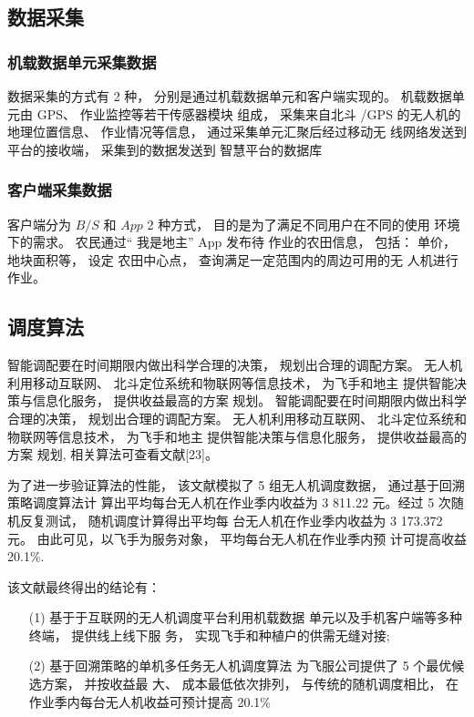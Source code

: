 \documentclass[UTF8,a4paper,10pt,nocolorlinks]{ctexart}
\begin{document}
\subsection{数据采集}
\subsubsection{机载数据单元采集数据}
数据采集的方式有
2 种， 分别是通过机载数据单元和客户端实现的。
机载数据单元由 GPS、 作业监控等若干传感器模块
组成， 采集来自北斗 /GPS 的无人机的地理位置信息、
作业情况等信息， 通过采集单元汇聚后经过移动无
线网络发送到平台的接收端， 采集到的数据发送到
智慧平台的数据库
\subsubsection{客户端采集数据}
客户端分为 $B/S$ 和 $App$ 2 种方式， 目的是为了满足不同用户在不同的使用
环境下的需求。 农民通过“ 我是地主” App 发布待
作业的农田信息， 包括： 单价， 地块面积等， 设定
农田中心点， 查询满足一定范围内的周边可用的无
人机进行作业。 
\subsection{调度算法}
智能调配要在时间期限内做出科学合理的决策，
规划出合理的调配方案。 无人机利用移动互联网、
北斗定位系统和物联网等信息技术， 为飞手和地主
提供智能决策与信息化服务， 提供收益最高的方案
规划。
智能调配要在时间期限内做出科学合理的决策，
规划出合理的调配方案。 无人机利用移动互联网、
北斗定位系统和物联网等信息技术， 为飞手和地主
提供智能决策与信息化服务， 提供收益最高的方案
规划, 相关算法可查看文献[23]。\par
为了进一步验证算法的性能， 该文献模拟了 5 组无人机调度数据， 通过基于回溯策略调度算法计
算出平均每台无人机在作业季内收益为 3 811.22 元。经过 5 次随机反复测试， 随机调度计算得出平均每
台无人机在作业季内收益为 3 173.372 元。 由此可见，以飞手为服务对象， 平均每台无人机在作业季内预
计可提高收益 20.1\%.\par
该文献最终得出的结论有：
\begin{itemize}
  \item [(1)] 
  基于于互联网的无人机调度平台利用机载数据
  单元以及手机客户端等多种终端， 提供线上线下服
  务， 实现飞手和种植户的供需无缝对接;
  \item [(2)]
  基于回溯策略的单机多任务无人机调度算法
  为飞服公司提供了 5 个最优候选方案， 并按收益最
  大、 成本最低依次排列， 与传统的随机调度相比，
  在作业季内每台无人机收益可预计提高 20.1\%
\end{itemize}
\end{document}
